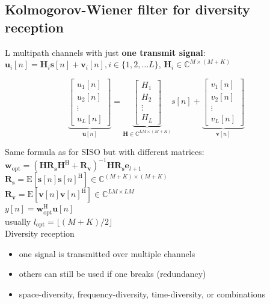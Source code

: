 \documentclass[english]{latex4ei/latex4ei_sheet}
\begin{document}
\begin{sectionbox}
  \subsection{Kolmogorov-Wiener filter for diversity reception}
  L multipath channels with just \textbf{one transmit signal}:\\
  $\boldsymbol{u}_{i}[n]=\boldsymbol{H}_{i} \boldsymbol{s}[n]+\boldsymbol{v}_{i}[n], i \in\{1,2, \ldots L\}$, $\boldsymbol{H}_{i} \in \mathbb{C}^{M\times(M+K)}$

  $$\underbrace{\left[\begin{array}{c}
    u_{1}[n] \\
    u_{2}[n] \\
    \vdots \\
    u_{L}[n]
    \end{array}\right]}_{\boldsymbol{u}[n]}=\underbrace{\left[\begin{array}{c}
    H_{1} \\
    H_{2} \\
    \vdots \\
    H_{L}
    \end{array}\right]}_{\boldsymbol{H}\in\mathbb{C}^{LM\times(M+K)}} s[n]+\underbrace{\left[\begin{array}{c}
    v_{1}[n] \\
    v_{2}[n] \\
    \vdots \\
    v_{L}[n]
    \end{array}\right]}_{\boldsymbol{v}[n]}$$

    Same formula as for SISO but with different matrices:\\
    $\boldsymbol{w}_{\mathrm{opt}}=\left(\boldsymbol{H} \boldsymbol{R}_{\boldsymbol{s}} \boldsymbol{H}^{\mathrm{H}}+\boldsymbol{R}_{\boldsymbol{v}}\right)^{-1} \boldsymbol{H} \boldsymbol{R}_{\boldsymbol{s}} \mathbf{e}_{l+1}$\\
    $\boldsymbol{R}_{\boldsymbol{s}}=\mathrm{E}\left[\boldsymbol{s}[n] \boldsymbol{s}[n]^{\mathrm{H}}\right] \in \mathbb{C}^{(M+K) \times(M+K)}$\\
    $\boldsymbol{R}_{\boldsymbol{v}}=\mathrm{E}\left[\boldsymbol{v}[n] \boldsymbol{v}[n]^{\mathrm{H}}\right] \in \mathbb{C}^{L M \times L M}$\\
    $y[n]=\boldsymbol{w}_{\mathrm{opt}}^{\mathrm{H}} \boldsymbol{u}[n]$\\
    usually $l_{\text{opt}}=\lfloor(M+K) / 2\rfloor$\\

    Diversity reception
    \begin{itemize}
      \item one signal is transmitted over multiple channels
      \item others can still be used if one breaks (redundancy)
      \item space-diversity, frequency-diversity, time-diversity, or combinations
    \end{itemize}
  \end{sectionbox}
\end{document}
